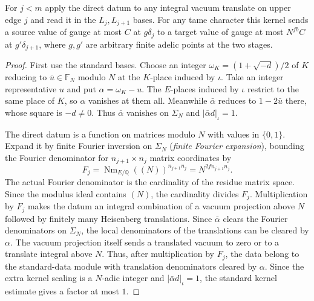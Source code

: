 \begin{lemma}
\label{lem:a-level-direct-gauge}
\emitthmsource
For $j<m$ apply the direct datum to any integral vacuum translate on upper edge $j$ and read it in the $L_j,L_{j+1}$ bases. For any tame character this kernel sends a source value of gauge at most $C$ at $g\delta_j$ to a target value of gauge at most $N^{fb}C$ at $g'\delta_{j+1}$, where $g,g'$ are arbitrary finite adelic points at the two stages.
\end{lemma}
\begin{proof}
First use the standard bases. Choose an integer $\omega_K=(1+\sqrt{-d})/2$ of $K$ reducing to $\bar u\in\mathbb F_N$ modulo $N$ at the $K$-place induced by $\iota$. Take an integer representative $u$ and put $\alpha=\omega_K-u$. The $E$-places induced by $\iota$ restrict to the same place of $K$, so $\alpha$ vanishes at them all. Meanwhile $\bar\alpha$ reduces to $1-2\bar u$ there, whose square is $-d\ne0$. Thus $\bar\alpha$ vanishes on $\Sigma_N$ and $|\bar\alpha d|_\iota=1$.

The direct datum is a function on matrices modulo $N$ with values in $\{0,1\}$. Expand it by finite Fourier inversion on $\Sigma_N$ (\emph{finite Fourier expansion}), bounding the Fourier denominator for $n_{j+1}\times n_j$ matrix coordinates by
\[
 F_j=\operatorname{Nm}_{E/\mathbb Q}((N))^{n_{j+1}n_j}
     =N^{2f n_{j+1}n_j}.
\]
The actual Fourier denominator is the cardinality of the residue matrix space. Since the modulus ideal contains $(N)$, the cardinality divides $F_j$. Multiplication by $F_j$ makes the datum an integral combination of a vacuum projection above $N$ followed by finitely many Heisenberg translations. Since $\bar\alpha$ clears the Fourier denominators on $\Sigma_N$, the local denominators of the translations can be cleared by $\alpha$. The vacuum projection itself sends a translated vacuum to zero or to a translate integral above $N$. Thus, after multiplication by $F_j$, the data belong to the standard-data module with translation denominators cleared by $\alpha$. Since the extra kernel scaling is a $N$-adic integer and $|\bar\alpha d|_\iota=1$, the standard kernel estimate gives a factor at most $1$.


\end{proof}

